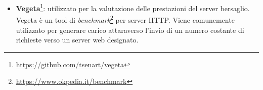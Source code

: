 \begin{itemize}
\begin{itemize}
    \item \textbf{orig\_bytes} e \textbf{resp\_bytes}: byte a livello applicativo inviati rispettivamente dall'originator e dal responder;
    \item \textbf{conn\_state}: lo stato finale della connessione rappresentato da un codice sintetico (e.g. SF, S0, S1) che ne indica l'esito;
    \item \textbf{local\_orig} e \textbf{local\_resp}: valori booleani che indicano se l'indirizzo dell'originator e del responder sono nella rete locale;
    \item \textbf{missed\_bytes}: byte persi durante la connessione;
    \item \textbf{history}: una stringa che rappresenta gli eventi principali della connessione (e.g. scambio di SYN, ACK, FIN);
    \item \textbf{orig\_pkts} e \textbf{resp\_pkts}: contatori che rappresentano rispettivamente i pacchetti inviati dall'originator e dal responder durante la connessione;
    \item \textbf{orig\_ip\_bytes} e \textbf{resp\_ip\_bytes}: byte totali inviati rispettivamente dall'originator e dal responder. Calcolati sommando i valori del campo \emph{total\_length} negli header IP dei pacchetti.
\end{itemize}
\item \textbf{Vegeta}\footnote{\url{https://github.com/tsenart/vegeta}}: utilizzato per la valutazione delle prestazioni del server bersaglio. Vegeta è un tool di \emph{benchmark}\footnote{\url{https://www.okpedia.it/benchmark}} per server HTTP. Viene comunemente utilizzato per generare carico attaraverso l'invio di un numero costante di richieste verso un server web designato.
\end{itemize}

